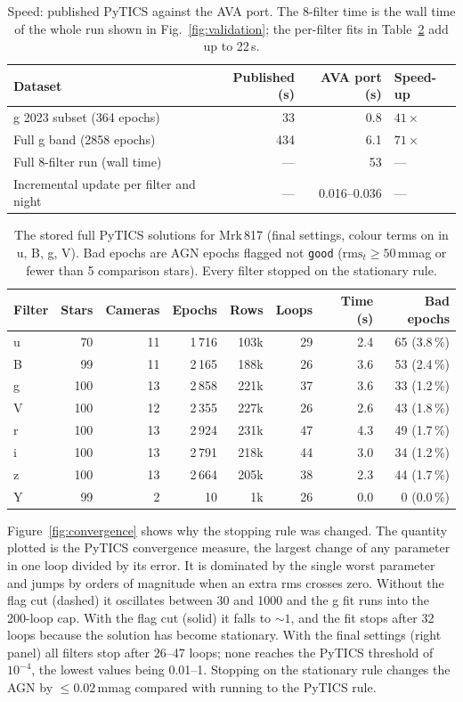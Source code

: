 \documentclass[10pt,a4paper,oneside]{report}
\renewcommand{\_}{\oldunderscore\allowbreak}
\begin{document}
\begin{table}[htbp]
\centering
\caption{Speed: published PyTICS against the AVA port. The 8-filter time is the wall time of the whole
  run shown in Fig.~\ref{fig:validation}; the per-filter fits in Table~\ref{tab:fullfit} add up to 22\,s.}
\label{tab:speed}
\small
\begin{tabular}{lrrl}
\toprule
Dataset & Published (s) & AVA port (s) & Speed-up \\
\midrule
g 2023 subset (364 epochs) & 33 & 0.8 & $41\times$ \\
Full g band (2858 epochs) & 434 & 6.1 & $71\times$ \\
Full 8-filter run (wall time) & --- & 53 & --- \\
Incremental update per filter and night & --- & 0.016--0.036 & --- \\
\bottomrule
\end{tabular}
\end{table}

\begin{table}[htbp]
\centering
\caption{The stored full PyTICS solutions for Mrk\,817 (final settings, colour terms on in u, B, g, V).
  Bad epochs are AGN epochs flagged not \texttt{good} ($\mathrm{rms}_t\geq50$\,mmag or fewer than 5
  comparison stars). Every filter stopped on the stationary rule.}
\label{tab:fullfit}
\small
\begin{tabular}{lrrrrrrr}
\toprule
Filter & Stars & Cameras & Epochs & Rows & Loops & Time (s) & Bad epochs \\
\midrule
u &  70 & 11 & 1\,716 & 103k & 29 & 2.4 & 65 (3.8\,\%) \\
B &  99 & 11 & 2\,165 & 188k & 26 & 3.6 & 53 (2.4\,\%) \\
g & 100 & 13 & 2\,858 & 221k & 37 & 3.6 & 33 (1.2\,\%) \\
V & 100 & 12 & 2\,355 & 227k & 26 & 2.6 & 43 (1.8\,\%) \\
r & 100 & 13 & 2\,924 & 231k & 47 & 4.3 & 49 (1.7\,\%) \\
i & 100 & 13 & 2\,791 & 218k & 44 & 3.0 & 34 (1.2\,\%) \\
z & 100 & 13 & 2\,664 & 205k & 38 & 2.3 & 44 (1.7\,\%) \\
Y &  99 &  2 &     10 &   1k & 26 & 0.0 &  0 (0.0\,\%) \\
\bottomrule
\end{tabular}
\end{table}

Figure~\ref{fig:convergence} shows why the stopping rule was changed. The quantity plotted is the
PyTICS convergence measure, the largest change of any parameter in one loop divided by its error. It is
dominated by the single worst parameter and jumps by orders of magnitude when an extra rms crosses zero.
Without the flag cut (dashed) it oscillates between 30 and 1000 and the g fit runs into the 200-loop cap.
With the flag cut (solid) it falls to ${\sim}1$, and the fit stops after 32 loops because the solution
has become stationary. With the final settings (right panel) all filters stop after 26--47 loops; none
reaches the PyTICS threshold of $10^{-4}$, the lowest values being 0.01--1. Stopping on the stationary
rule changes the AGN by $\leq0.02$\,mmag compared with running to the PyTICS rule.
\end{document}
